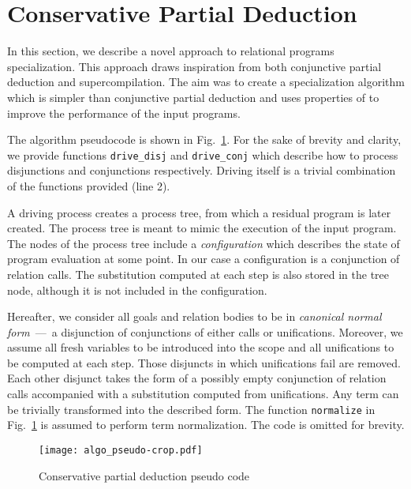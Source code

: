 \newcommand{\code}[1]{\texttt{#1}}

\section{Conservative Partial Deduction}

In this section, we describe a novel approach to relational programs specialization.
This approach draws inspiration from both conjunctive partial deduction and supercompilation.
The aim was to create a specialization algorithm which is simpler than conjunctive partial deduction and uses properties of \mk to improve the performance of the input programs.

The algorithm pseudocode is shown in Fig.~\ref{fig:ncpd-pseudo}.
For the sake of brevity and clarity, we provide functions \code{drive\_disj} and \code{drive\_conj} which describe how to process disjunctions and conjunctions respectively.
Driving itself is a trivial combination of the functions provided (line 2).

A driving process creates a process tree, from which a residual program is later created.
The process tree is meant to mimic the execution of the input program.
The nodes of the process tree include a \emph{configuration} which describes the state of program evaluation at some point.
In our case a configuration is a conjunction of relation calls.
The substitution computed at each step is also stored in the tree node, although it is not included in the configuration.

Hereafter, we consider all goals and relation bodies to be in \emph{canonical normal form}~---~a disjunction of conjunctions of either calls or unifications.
Moreover, we assume all fresh variables to be introduced into the scope and all unifications to be computed at each step.
Those disjuncts in which unifications fail are removed.
Each other disjunct takes the form of a possibly empty conjunction of relation calls accompanied with a substitution computed from unifications.
Any \mk term can be trivially transformed into the described form.
The function \code{normalize} in Fig.~\ref{fig:ncpd-pseudo} is assumed to perform term normalization.
The code is omitted for brevity.

\begin{figure}[!t]
  \centering
  \texttt{[image: algo\_pseudo-crop.pdf]}
  \caption{Conservative partial deduction pseudo code}
  \label{fig:ncpd-pseudo}
\end{figure}

